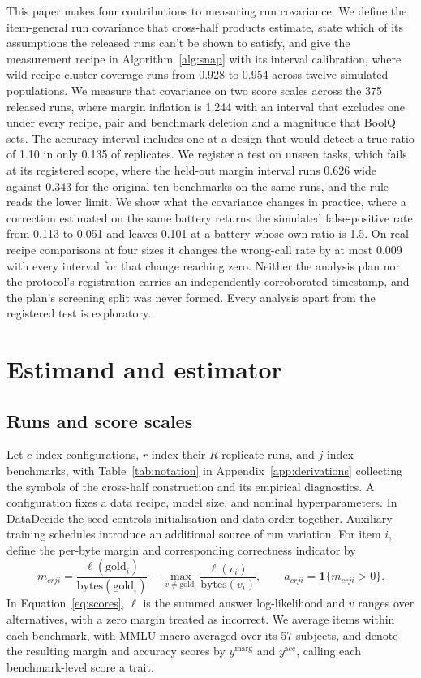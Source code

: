 \documentclass{article}
\begin{document}
This paper makes four contributions to measuring run covariance. We define the item-general run covariance that cross-half products estimate, state which of its assumptions the released runs can't be shown to satisfy, and give the measurement recipe in Algorithm~\ref{alg:snap} with its interval calibration, where wild recipe-cluster coverage runs from 0.928 to 0.954 across twelve simulated populations. We measure that covariance on two score scales across the 375 released runs, where margin inflation is 1.244 with an interval that excludes one under every recipe, pair and benchmark deletion and a magnitude that BoolQ sets. The accuracy interval includes one at a design that would detect a true ratio of 1.10 in only 0.135 of replicates. We register a test on unseen tasks, which fails at its registered scope, where the held-out margin interval runs 0.626 wide against 0.343 for the original ten benchmarks on the same runs, and the rule reads the lower limit. We show what the covariance changes in practice, where a correction estimated on the same battery returns the simulated false-positive rate from 0.113 to 0.051 and leaves 0.101 at a battery whose own ratio is 1.5. On real recipe comparisons at four sizes it changes the wrong-call rate by at most 0.009 with every interval for that change reaching zero. Neither the analysis plan nor the protocol's registration carries an independently corroborated timestamp, and the plan's screening split was never formed. Every analysis apart from the registered test is exploratory.

\section{Estimand and estimator}
\label{sec:estimator}
\subsection{Runs and score scales}
Let $c$ index configurations, $r$ index their $R$ replicate runs, and $j$ index benchmarks, with Table~\ref{tab:notation} in Appendix~\ref{app:derivations} collecting the symbols of the cross-half construction and its empirical diagnostics. A configuration fixes a data recipe, model size, and nominal hyperparameters. In DataDecide the seed controls initialisation and data order together. Auxiliary training schedules introduce an additional source of run variation. For item $i$, define the per-byte margin and corresponding correctness indicator by
\begin{equation}
m_{crji}=\frac{\ell(\mathrm{gold}_i)}{\mathrm{bytes}(\mathrm{gold}_i)}-
\max_{v\ne\mathrm{gold}_i}\frac{\ell(v_i)}{\mathrm{bytes}(v_i)},
\qquad a_{crji}=\mathbf{1}\{m_{crji}>0\}.
\label{eq:scores}
\end{equation}
In Equation~\ref{eq:scores}, $\ell$ is the summed answer log-likelihood and $v$ ranges over alternatives, with a zero margin treated as incorrect. We average items within each benchmark, with MMLU macro-averaged over its 57 subjects, and denote the resulting margin and accuracy scores by $y^{\mathrm{marg}}$ and $y^{\mathrm{acc}}$, calling each benchmark-level score a trait.
\end{document}
